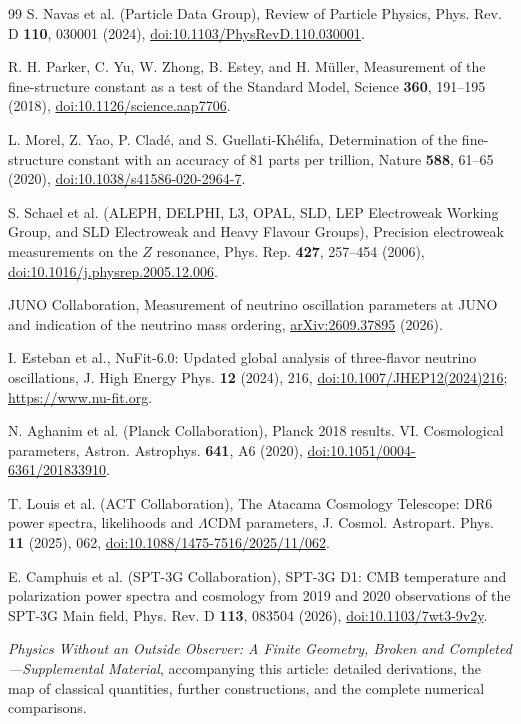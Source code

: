 \documentclass[aps,prx,reprint,longbibliography]{revtex4-2}
\begin{document}
\begin{thebibliography}{99}
S. Navas et al. (Particle Data Group), Review of Particle Physics,
Phys. Rev. D \textbf{110}, 030001 (2024),
\href{https://doi.org/10.1103/PhysRevD.110.030001}{doi:10.1103/PhysRevD.110.030001}.

R. H. Parker, C. Yu, W. Zhong, B. Estey, and H. M\"uller,
Measurement of the fine-structure constant as a test of the Standard Model,
Science \textbf{360}, 191--195 (2018),
\href{https://doi.org/10.1126/science.aap7706}{doi:10.1126/science.aap7706}.

L. Morel, Z. Yao, P. Clad\'e, and S. Guellati-Kh\'elifa,
Determination of the fine-structure constant with an accuracy of 81 parts per trillion,
Nature \textbf{588}, 61--65 (2020),
\href{https://doi.org/10.1038/s41586-020-2964-7}{doi:10.1038/s41586-020-2964-7}.

S. Schael et al. (ALEPH, DELPHI, L3, OPAL, SLD, LEP Electroweak Working Group, and SLD Electroweak and Heavy Flavour Groups),
Precision electroweak measurements on the $Z$ resonance,
Phys. Rep. \textbf{427}, 257--454 (2006),
\href{https://doi.org/10.1016/j.physrep.2005.12.006}{doi:10.1016/j.physrep.2005.12.006}.

JUNO Collaboration, Measurement of neutrino oscillation parameters at JUNO and indication of the neutrino mass ordering,
\href{https://arxiv.org/abs/2609.37895}{arXiv:2609.37895} (2026).

I. Esteban et al., NuFit-6.0: Updated global analysis of three-flavor neutrino oscillations,
J. High Energy Phys. \textbf{12} (2024), 216,
\href{https://doi.org/10.1007/JHEP12(2024)216}{doi:10.1007/JHEP12(2024)216};
\url{https://www.nu-fit.org}.

N. Aghanim et al. (Planck Collaboration), Planck 2018 results. VI. Cosmological parameters,
Astron. Astrophys. \textbf{641}, A6 (2020),
\href{https://doi.org/10.1051/0004-6361/201833910}{doi:10.1051/0004-6361/201833910}.

T. Louis et al. (ACT Collaboration), The Atacama Cosmology Telescope: DR6 power spectra, likelihoods and $\Lambda$CDM parameters,
J. Cosmol. Astropart. Phys. \textbf{11} (2025), 062,
\href{https://doi.org/10.1088/1475-7516/2025/11/062}{doi:10.1088/1475-7516/2025/11/062}.

E. Camphuis et al. (SPT-3G Collaboration), SPT-3G D1: CMB temperature and polarization power spectra and cosmology from 2019 and 2020 observations of the SPT-3G Main field,
Phys. Rev. D \textbf{113}, 083504 (2026),
\href{https://doi.org/10.1103/7wt3-9v2y}{doi:10.1103/7wt3-9v2y}.

\emph{Physics Without an Outside Observer: A Finite Geometry, Broken and Completed---Supplemental Material},
accompanying this article: detailed derivations, the map of classical quantities, further constructions, and the complete numerical comparisons.

\end{thebibliography}
\end{document}
